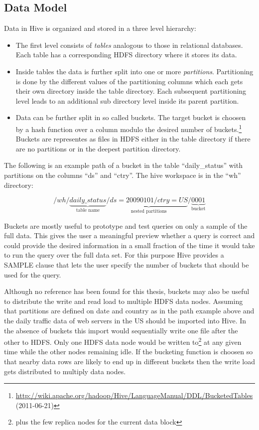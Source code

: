\documentclass[12pt,a4paper]{scrartcl}		%
\newcommand{\citeurl}[2]{\url{#1} (#2)}
\begin{document}
\subsection{Data Model}

Data in Hive is organized and stored in a three level hierarchy:

\begin{itemize}
\item The first level consists of \emph{tables} analogous to those in relational databases. Each table has a corresponding HDFS directory where it stores its data.
\item Inside tables the data is further split into one or more \emph{partitions}. Partitioning is done by the different values of the partitioning columns which each gets their own directory inside the table directory. Each subsequent partitioning level leads to an additional sub directory level inside its parent partition.
\item Data can be further split in so called buckets. The target bucket is choosen by a hash function over a column modulo the desired number of buckets.\footnote{\citeurl{http://wiki.apache.org/hadoop/Hive/LanguageManual/DDL/BucketedTables}{2011-06-21}} Buckets are representes as files in HDFS either in the table directory if there are no partitions or in the deepest partition directory.
\end{itemize}

The following is an example path of a bucket in the table ``daily\_status'' with partitions on the columns ``ds'' and ``ctry''. The hive workspace is in the ``wh'' directory:

\begin{displaymath}
  /wh/\underbrace{daily\_status}_{\text{table name}}/\underbrace{ds=20090101/ctry=US}_{\text{nested partitions}}/\underbrace{0001}_{\text{bucket}}
\end{displaymath}

Buckets are mostly useful to prototype and test queries on only a sample of the full data. This gives the user a meaningful preview whether a query is correct and could provide the desired information in a small fraction of the time it would take to run the query over the full data set. For this purpose Hive provides a SAMPLE clause that lets the user specify the number of buckets that should be used for the query.

Although no reference has been found for this thesis, buckets may also be useful to distribute the write and read load to multiple HDFS data nodes. Assuming that partitions are defined on date and country as in the path example above and the daily traffic data of web servers in the US should be imported into Hive. In the absence of buckets this import would sequentially write one file after the other to HDFS. Only one HDFS data node would be written to\footnote{plus the few replica nodes for the current data block} at any given time while the other nodes remaining idle. If the bucketing function is choosen so that nearby data rows are likely to end up in different buckets then the write load gets distributed to multiply data nodes.
\end{document}
